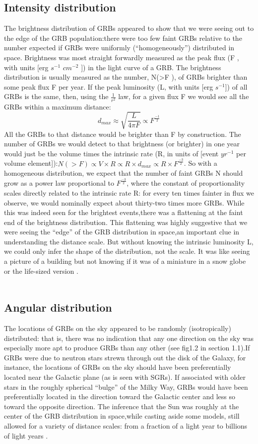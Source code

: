 \subsection{Intensity distribution}
The brightness distribution of GRBs appeared to show that we were seeing out to the edge of the GRB population:there were too few faint GRBs relative to the number expected if GRBs were uniformly (“homogeneously”) distributed in space.
Brightness was most straight forwardly measured as the peak flux (F , with units [erg $ s^{-1} $ $cm^{-2} $ ]) in the light curve of a GRB. The brightness distribution is usually measured as the number, N(>F ), of GRBs brighter than some peak flux F per year. If the peak luminosity (L, with units [erg $ s^{-1} $]) of all GRBs is the same, then, using the $\frac{1}{r^{2}}$ law, for a given flux F we would see all the GRBs within a maximum distance:\citep{7} \citep{ 12 }
$$
d_{max}\approx\sqrt{\frac{L}{4\pi F}}\varpropto F^{\frac{-1}{2}}
$$
All the GRBs to that distance would be brighter than F by construction. The
number of GRBs we would detect to that brightness (or brighter) in one year would
just be the volume times the intrinsic rate (R, in units of [event $yr^{-1}$ per volume element]):$ N (> F ) \propto V \times R \propto R \times d_{max} \propto R \times F^{\frac{-3}{2}}$.  So with a homogeneous distribution, we expect that the number of faint GRBs N should grow as a power law proportional to $ F^{\frac{-3}{2}} $, where the constant of proportionality scales directly related to the intrinsic rate R: for every ten times fainter in flux we observe, we would nominally expect about thirty-two times more GRBs. While this was indeed seen for the brightest events,there was a flattening at the faint end of the brightness distribution. This flattening was highly suggestive that we were seeing the “edge” of the GRB distribution in space,an important clue in understanding the distance scale. But without knowing the intrinsic luminosity L, we could only infer the shape of the distribution, not the scale. It was like seeing a picture of a building but not knowing if it was of a miniature in a snow globe or the life-sized version .\citep{7} \citep{ 12 } \\\\
\subsection{Angular distribution}
The locations of GRBs on the sky appeared to be randomly (isotropically) distributed:
that is, there was no indication that any one direction on the sky was especially
more apt to produce GRBs than any other (see fig1.2 in section 1.1).If GRBs were due to neutron stars strewn through out the disk of the Galaxy, for instance, the locations of GRBs on the sky should have been preferentially located near the Galactic plane (as is seen with SGRs). If associated with older stars in the roughly spherical “bulge” of the Milky Way, GRBs would have been preferentially located in the direction toward the Galactic center and less so toward the opposite direction.
The inference that the Sun was roughly at the center of the GRB distribution in space,while casting aside some models, still allowed for a variety of distance scales: from a fraction of a light year to billions of light years \citep{7}.
